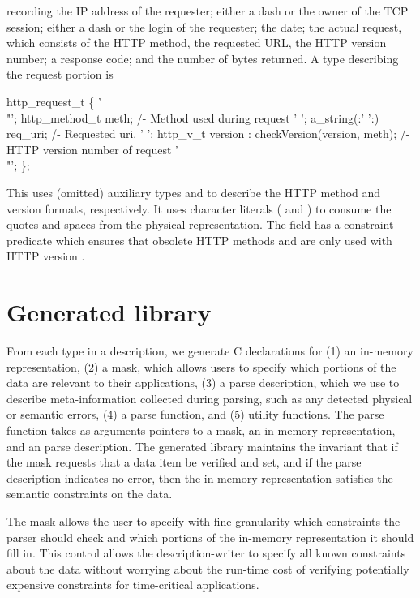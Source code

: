 \noindent
recording the IP address of the requester; either a dash or the owner
of the TCP session; either a dash or the login of the requester; the
date; the actual request, which consists of the HTTP method, the
requested URL, the HTTP version number; a response code; and the
number of bytes returned.  A \padsl{} type describing the request
portion is
\begin{code}
 http_request_t \{
  '\\"'; http_method_t   meth;           /- Method used during request
  ' ';  a_string(:' ':) req_uri;        /- Requested uri.
  ' ';  http_v_t        version : checkVersion(version, meth);
                                        /- HTTP version number of request 
  '\\"';
\};
\end{code}
This  uses (omitted) auxiliary types  and
 to describe
the HTTP method and version formats, respectively.
It uses character literals ( and ) to consume
the quotes and 
spaces from the physical representation. 
The  field has a constraint predicate 
which ensures that obsolete HTTP methods  and  
are only used with HTTP version .

\section{Generated library}
From each type in a \padsl{} description, we generate C declarations for
(1) an in-memory representation, 
(2) a mask, which allows users to specify which portions of the data
are relevant to their applications, 
(3) a  parse description, which we use to describe meta-information
collected during parsing, such as any detected physical or semantic errors,
(4) a parse function, and 
(5) utility functions.
The parse function takes as arguments pointers to a mask, an
in-memory representation, and an parse description.  The generated
library maintains the invariant that if the mask requests
that a data item be verified and set, and if the parse description
indicates no error, then the in-memory representation satisfies the
semantic constraints on the data.

The mask allows the user to specify with fine granularity
which constraints the parser should check and which portions of the
in-memory representation it should fill in.  This control allows the
description-writer to specify all known constraints about the data
without worrying about the run-time cost of verifying potentially
expensive constraints for time-critical applications.

